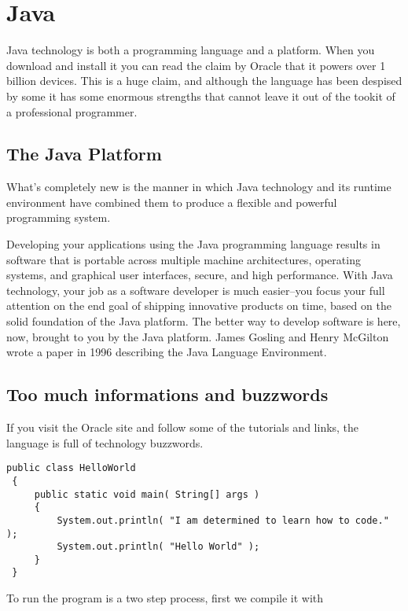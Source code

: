 \chapter{Java}

Java technology is both a programming language and a platform. When you download and install
it you can read the claim by Oracle that it powers over 1 billion devices. This is a huge
claim, and although the language has been despised by some it has some enormous strengths
that cannot leave it out of the tookit of a professional programmer. 

\section{The Java Platform}

What's completely new is the manner in which Java technology and its runtime environment have combined them to produce a 
flexible and powerful programming system.

Developing your applications using the Java programming language results in software that is portable across multiple machine architectures, operating systems, and graphical user interfaces, secure, and high performance. With Java technology, your job as a software developer is much easier--you focus your full attention on the end goal of shipping innovative products on time, based on the solid foundation of the Java platform. The better way to develop software is here, now, brought to you by the Java platform. James Gosling and Henry McGilton
wrote a paper in 1996 describing the Java Language Environment.

\section{Too much informations and buzzwords}

If you visit the Oracle site and follow some of the tutorials and links, the language is full
of technology buzzwords.

\begin{verbatim}
public class HelloWorld
 {
     public static void main( String[] args )
     {
         System.out.println( "I am determined to learn how to code." );
         System.out.println( "Hello World" );
     }
 }
\end{verbatim}

To run the program is a two step process, first we compile it with 


